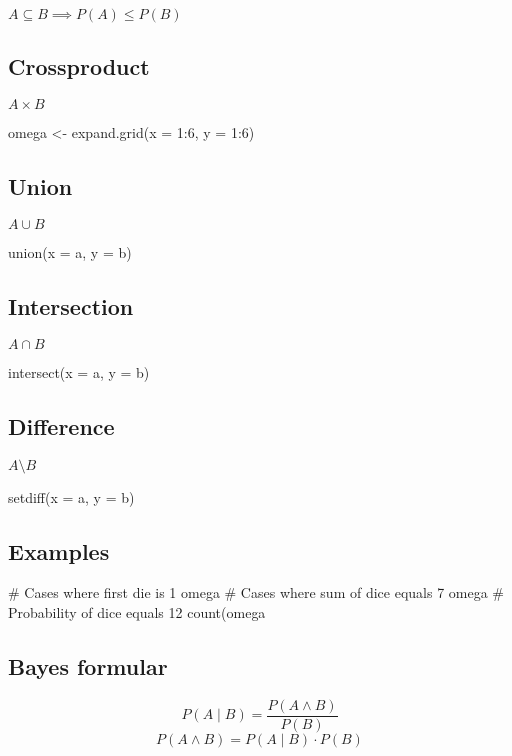 $A \subseteq B \implies P(A) \leq P(B)$
\begin{multicols*}{2}
\subsection{Crossproduct}
$A \times B$
\begin{rcode}{1}
omega <- expand.grid(x = 1:6, y = 1:6)
\end{rcode}

\subsection{Union}
$A \cup B$
\begin{rcode}{1}
union(x = a, y = b)
\end{rcode}

\subsection{Intersection}
$A \cap B$
\begin{rcode}{1}
intersect(x = a, y = b)
\end{rcode}

\subsection{Difference}
$A \setminus B$
\begin{rcode}{1}
setdiff(x = a, y = b)
\end{rcode}

\subsection{Examples}
\begin{rcode}{1}
# Cases where first die is 1
omega %
# Cases where sum of dice equals 7
omega %
# Probability of dice equals 12
count(omega %
\end{rcode}
\columnbreak
\subsection{Bayes formular}
\large
$$
P(A\mid B) = \frac{P(A \land B)}{P(B)}
$$
$$
P(A\land B) = P(A\mid B) \cdot P(B)
$$
\normalsize
\end{multicols*}